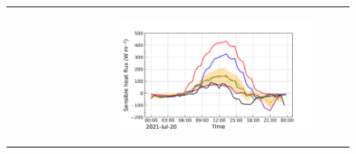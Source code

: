 \begin{figure}[hbtp]
\begin{tabular}{cc}
\begin{subfigure}[t]{0.5\textwidth}
        \end{subfigure} &
        \begin{subfigure}[t]{0.5\textwidth}
            \caption{}
            \includegraphics[width=\textwidth]{images/chap5/IOP_TS/TS_2021-07-20_cendrosa_sens.png}
        \end{subfigure} \\
    \end{tabular}
    \caption{}
    \label{fig:iop_days_TS_energy}
\end{figure}

